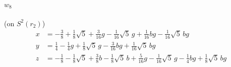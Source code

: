 \documentclass[11pt]{article}
\theoremstyle{remark}
\begin{document}
{\paragraph{$w_{8}$} (on $S^2(r_2)$)
\begin{align*}
x&=-\tfrac{3}{8}+\tfrac{1}{8}\sqrt5+\tfrac{3}{16}g-\tfrac{1}{16}\sqrt5\,g+\tfrac{1}{16}bg-\tfrac{1}{16}\sqrt5\,bg\\
y&=\tfrac{1}{4}-\tfrac{1}{4}g+\tfrac{1}{8}\sqrt5\,g-\tfrac{3}{16}bg+\tfrac{1}{16}\sqrt5\,bg\\
z&=-\tfrac{1}{8}-\tfrac{1}{8}\sqrt5+\tfrac{3}{8}b-\tfrac{1}{8}\sqrt5\,b+\tfrac{5}{16}g-\tfrac{1}{16}\sqrt5\,g-\tfrac{1}{4}bg+\tfrac{1}{8}\sqrt5\,bg
\end{align*}
}
\end{document}

